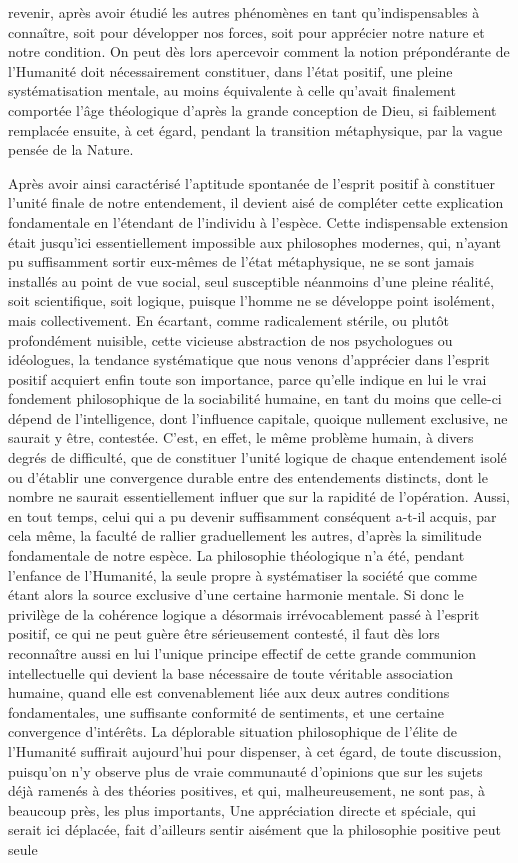 \documentclass[french,twoside]{book} %
\begin{document}
revenir, après avoir étudié les autres phénomènes en tant qu’indispensables à connaître, soit pour développer nos forces, soit pour apprécier notre nature et notre condition. On peut dès lors apercevoir comment la notion prépondérante de l’Humanité doit nécessairement constituer, dans l’état positif, une pleine systématisation mentale, au moins équivalente à celle qu’avait finalement comportée l’âge théologique d’après la grande conception de Dieu, si faiblement remplacée ensuite, à cet égard, pendant la transition métaphysique, par la vague pensée de la Nature.\par
Après avoir ainsi caractérisé l’aptitude spontanée de l’esprit positif à constituer l’unité finale de notre entendement, il devient aisé de compléter cette explication fondamentale en l’étendant de l’individu à l’espèce. Cette indispensable extension était jusqu’ici essentiellement impossible aux philosophes modernes, qui, n’ayant pu suffisamment sortir eux-mêmes de l’état métaphysique, ne se sont jamais installés au point de vue social, seul susceptible néanmoins d’une pleine réalité, soit scientifique, soit logique, puisque l’homme ne se développe point isolément, mais collectivement. En écartant, comme radicalement stérile, ou plutôt profondément nuisible, cette vicieuse abstraction de nos psychologues ou idéologues, la tendance systématique que nous venons d’apprécier dans l’esprit positif acquiert enfin toute son importance, parce qu’elle indique en lui le vrai fondement philosophique de la sociabilité humaine, en tant du moins que celle-ci dépend de l’intelligence, dont l’influence capitale, quoique nullement exclusive, ne saurait y être, contestée. C’est, en effet, le même problème humain, à divers degrés de difficulté, que de constituer l’unité logique de chaque entendement isolé ou d’établir une convergence durable entre des entendements distincts, dont le nombre ne saurait essentiellement influer que sur la rapidité de l’opération. Aussi, en tout temps, celui qui a pu devenir suffisamment conséquent a-t-il acquis, par cela même, la faculté de rallier graduellement les autres, d’après la similitude fondamentale de notre espèce. La philosophie théologique n’a été, pendant l’enfance de l’Humanité, la seule propre à systématiser la société que comme étant alors la source exclusive d’une certaine harmonie mentale. Si donc le privilège de la cohérence logique a désormais irrévocablement passé à l’esprit positif, ce qui ne peut guère être sérieusement contesté, il faut dès lors reconnaître aussi en lui l’unique principe effectif de cette grande communion intellectuelle qui devient la base nécessaire de toute véritable association humaine, quand elle est convenablement liée aux deux autres conditions fondamentales, une suffisante conformité de sentiments, et une certaine convergence d’intérêts. La déplorable situation philosophique de l’élite de l’Humanité suffirait aujourd’hui pour dispenser, à cet égard, de toute discussion, puisqu’on n’y observe plus de vraie communauté d’opinions que sur les sujets déjà ramenés à des théories positives, et qui, malheureusement, ne sont pas, à beaucoup près, les plus importants, Une appréciation directe et spéciale, qui serait ici déplacée, fait d’ailleurs sentir aisément que la philosophie positive peut seule 
\end{document}
